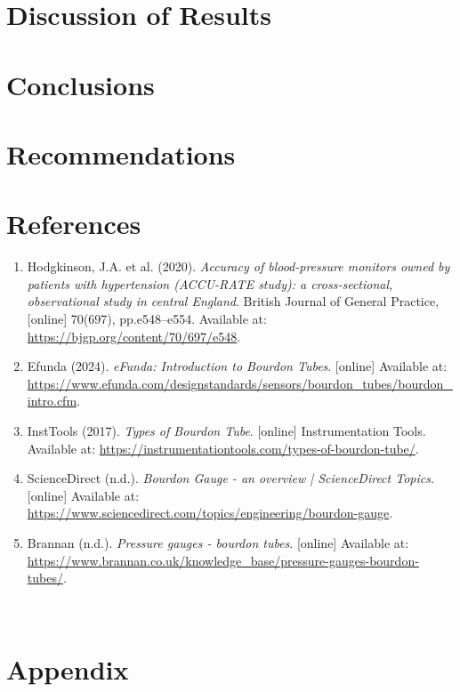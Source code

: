 \documentclass{article}
\begin{document}
	\newpage
	\section{Discussion of Results}
	
	
	\newpage\vspace*{-30pt}
	\section{Conclusions}
	\newpage\vspace*{-30pt}
	
	\section{Recommendations}  		
	\newpage\vspace*{-30pt}
	
	
	
	\section{References}	
	\begin{enumerate}
		\item Hodgkinson, J.A. et al. (2020). \textit{Accuracy of blood-pressure monitors owned by patients with hypertension (ACCU-RATE study): a cross-sectional, observational study in central England}. British Journal of General Practice, [online] 70(697), pp.e548–e554. Available at: \url{https://bjgp.org/content/70/697/e548}.
		\item Efunda (2024). \textit{eFunda: Introduction to Bourdon Tubes}. [online] Available at: \url{https://www.efunda.com/designstandards/sensors/bourdon_tubes/bourdon_intro.cfm}.
		\item InstTools (2017). \textit{Types of Bourdon Tube}. [online] Instrumentation Tools. Available at: \url{https://instrumentationtools.com/types-of-bourdon-tube/}.
		\item ScienceDirect (n.d.). \textit{Bourdon Gauge - an overview | ScienceDirect Topics}. [online] Available at: \url{https://www.sciencedirect.com/topics/engineering/bourdon-gauge}.
		‌\item Brannan (n.d.). \textit{Pressure gauges - bourdon tubes}. [online] Available at: \url{https://www.brannan.co.uk/knowledge_base/pressure-gauges-bourdon-tubes/}.
	\end{enumerate}
	‌	
	\newpage\vspace*{-30pt}
		
	
	\section{Appendix}
	
\end{document}
